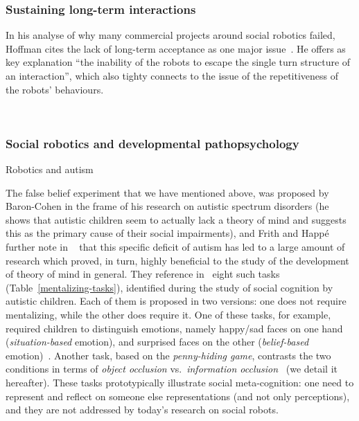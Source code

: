 \documentclass[11pt,a4paper]{report}
\begin{document}
\subsubsection{Sustaining long-term interactions}

In his analyse of why many commercial projects around social robotics failed,
Hoffman cites the lack of long-term acceptance as one major
issue~\cite{hoffman2019anki}. He offers as key explanation ``the inability of
the robots to escape the single turn structure of an interaction'', which also
tighty connects to the issue of the repetitiveness of the robots' behaviours.

~\cite{dereshev2019longterm}

\subsubsection{Social robotics and developmental pathopsychology}


Robotics and autism~\cite{pennisi2016autism}

The false belief experiment that we have mentioned above, was proposed by
Baron-Cohen in the frame of his research on autistic spectrum disorders (he
shows that autistic children seem to actually lack a theory of mind and suggests
this as the primary cause of their social impairments), and Frith and Happé
further note in ~\cite{frith1994autism} that this specific deficit of autism has
led to a large amount of research which proved, in turn, highly beneficial to
the study of the development of theory of mind in general. They reference
in~\cite{frith1994autism} eight such tasks (Table~\ref{mentalizing-tasks}),
identified during the study of social cognition by autistic children. Each of
them is proposed in two versions: one does not require mentalizing, while the
other does require it.  One of these tasks, for example, required children to
distinguish emotions, namely happy/sad faces on one hand (\emph{situation-based}
emotion), and surprised faces on the other (\emph{belief-based}
emotion)~\cite{baron1993children}.  Another task, based on the
\emph{penny-hiding game}, contrasts the two conditions in terms of \emph{object
occlusion} vs.~\emph{information occlusion}~\cite{baron1992out} (we detail it
hereafter). These tasks prototypically illustrate social meta-cognition: one
need to represent and reflect on someone else representations (and not only
perceptions), and they are not addressed by today's research on social robots.
\end{document}
